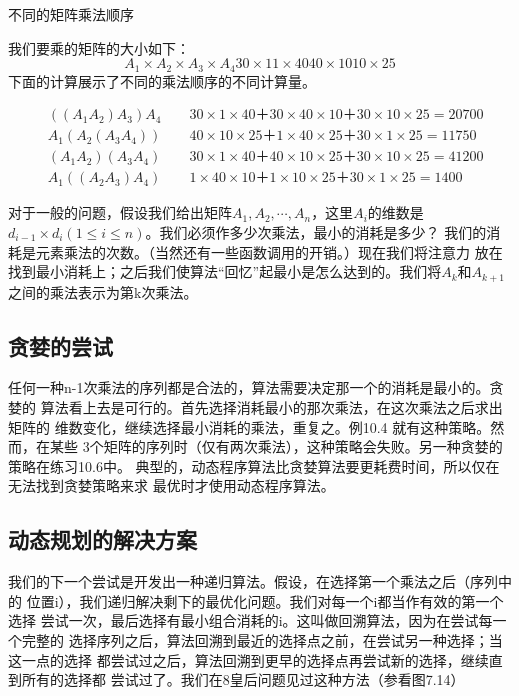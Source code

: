 \begin{example}
不同的矩阵乘法顺序

我们要乘的矩阵的大小如下：
\begin{displaymath}
A_1 \times   A_2   \times   A_3    \times  A_4
30\times 1  1\times 40   40\times 10    10\times 25
\end{displaymath}
下面的计算展示了不同的乘法顺序的不同计算量。

\begin{displaymath}
\begin{aligned}
&((A_1A_2)A_3)A_4  \qquad   30\times 1\times 40＋30\times 40\times 10＋30\times 10\times 25 = 20700\\
&A_1(A_2(A_3A_4))  \qquad   40\times 10\times 25＋1\times 40\times 25＋30\times 1\times 25 = 11750\\
&(A_1A_2)(A_3A_4)  \qquad   30\times 1\times 40＋40\times 10\times 25＋30\times 10\times 25 = 41200\\
&A_1((A_2A_3)A_4)  \qquad   1\times 40\times 10＋1\times 10\times 25＋30\times 1\times 25 = 1400
\end{aligned}
\end{displaymath}
\end{example}

对于一般的问题，假设我们给出矩阵$A_1, A_2, \cdots , A_n$，这里$A_i$的维数是
$d_{i-1}\times d_i (1\leq i \leq n)$。我们必须作多少次乘法，最小的消耗是多少？
我们的消耗是元素乘法的次数。（当然还有一些函数调用的开销。）现在我们将注意力
放在找到最小消耗上；之后我们使算法“回忆”起最小是怎么达到的。我们将$A_k$和$A_{k+1}$
之间的乘法表示为第k次乘法。

\subsection{贪婪的尝试}
任何一种n-1次乘法的序列都是合法的，算法需要决定那一个的消耗是最小的。贪婪的
算法看上去是可行的。首先选择消耗最小的那次乘法，在这次乘法之后求出 矩阵的
维数变化，继续选择最小消耗的乘法，重复之。例10.4 就有这种策略。然而，在某些
3个矩阵的序列时（仅有两次乘法），这种策略会失败。另一种贪婪的策略在练习10.6中。
典型的，动态程序算法比贪婪算法要更耗费时间，所以仅在无法找到贪婪策略来求
最优时才使用动态程序算法。

\subsection{动态规划的解决方案}
我们的下一个尝试是开发出一种递归算法。假设，在选择第一个乘法之后（序列中的
位置i），我们递归解决剩下的最优化问题。我们对每一个i都当作有效的第一个选择
尝试一次，最后选择有最小组合消耗的i。这叫做回溯算法，因为在尝试每一个完整的
选择序列之后，算法回溯到最近的选择点之前，在尝试另一种选择；当这一点的选择
都尝试过之后，算法回溯到更早的选择点再尝试新的选择，继续直到所有的选择都
尝试过了。我们在8皇后问题见过这种方法（参看图7.14）

